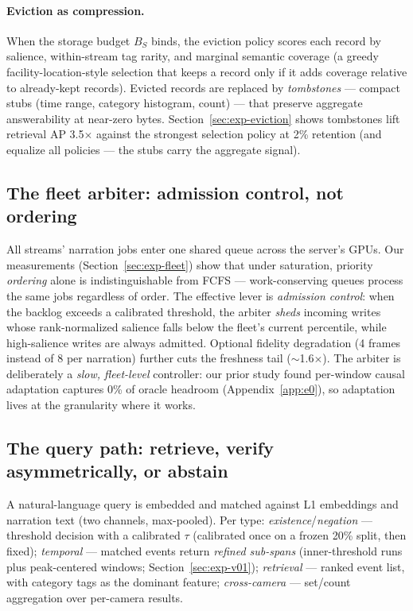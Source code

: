 \paragraph{Eviction as compression.} When the storage budget $B_S$ binds, the eviction policy scores each record by salience, within-stream tag rarity, and marginal semantic coverage (a greedy facility-location-style selection that keeps a record only if it adds coverage relative to already-kept records). Evicted records are replaced by \emph{tombstones} --- compact stubs (time range, category histogram, count) --- that preserve aggregate answerability at near-zero bytes. Section~\ref{sec:exp-eviction} shows tombstones lift retrieval AP 3.5$\times$ against the strongest selection policy at 2\% retention (and equalize all policies --- the stubs carry the aggregate signal).

\subsection{The fleet arbiter: admission control, not ordering}
\label{sec:design-arbiter}

All streams' narration jobs enter one shared queue across the server's GPUs. Our measurements (Section~\ref{sec:exp-fleet}) show that under saturation, priority \emph{ordering} alone is indistinguishable from FCFS --- work-conserving queues process the same jobs regardless of order. The effective lever is \emph{admission control}: when the backlog exceeds a calibrated threshold, the arbiter \emph{sheds} incoming writes whose rank-normalized salience falls below the fleet's current percentile, while high-salience writes are always admitted. Optional fidelity degradation (4 frames instead of 8 per narration) further cuts the freshness tail ($\sim$1.6$\times$). The arbiter is deliberately a \emph{slow, fleet-level} controller: our prior study found per-window causal adaptation captures 0\% of oracle headroom (Appendix~\ref{app:e0}), so adaptation lives at the granularity where it works.

\subsection{The query path: retrieve, verify asymmetrically, or abstain}
\label{sec:design-query}

A natural-language query is embedded and matched against L1 embeddings and narration text (two channels, max-pooled). Per type: \emph{existence}/\emph{negation} --- threshold decision with a calibrated $\tau$ (calibrated once on a frozen 20\% split, then fixed); \emph{temporal} --- matched events return \emph{refined sub-spans} (inner-threshold runs plus peak-centered windows; Section~\ref{sec:exp-v01}); \emph{retrieval} --- ranked event list, with category tags as the dominant feature; \emph{cross-camera} --- set/count aggregation over per-camera results.

